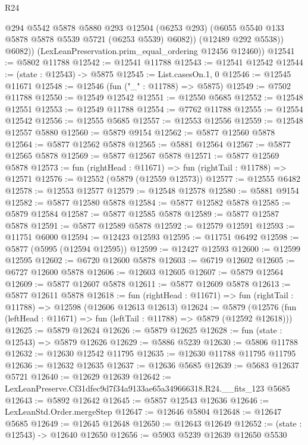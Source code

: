 \begin{lexlean}{R24}
\begin{coremodule}
              @294
              @5542
              @5878
              @5880
              @293
              @12504
              (@6253 @293)
              (@6055 @5540 @133 @5878 @5878 @5539 @5721 (@6253 @5539) @6082))
            (@12489 @292 @5538))
          @6082))
      (LexLeanPreservation.prim_equal_ordering @12456 @12460))
@12541 := @5802 @11788
@12542 := @12541 @11788
@12543 := @12541 @12542
@12544 := (state : @12543) -> @5875
@12545 := List.casesOn.{1, 0}
@12546 := @12545 @11671
@12548 := @12546 (fun ("_" : @11788) => @5875)
@12549 := @7502 @11788
@12550 := @12549 @12542
@12551 := @12550 @5685
@12552 := @12548 @12551
@12553 := @12549 @11788
@12554 := @7762 @11788
@12555 := @12554 @12542
@12556 := @12555 @5685
@12557 := @12553 @12556
@12559 := @12548 @12557 @5880
@12560 := @5879 @9154
@12562 := @5877 @12560 @5878
@12564 := @5877 @12562 @5878
@12565 := @5881 @12564
@12567 := @5877 @12565 @5878
@12569 := @5877 @12567 @5878
@12571 := @5877 @12569 @5878
@12573 := fun (rightHead : @11671) => fun (rightTail : @11788) => @12571
@12576 := @12552 (@5879 (@12559 @12573))
@12577 := @12555 @6482
@12578 := @12553 @12577
@12579 := @12548 @12578
@12580 := @5881 @9154
@12582 := @5877 @12580 @5878
@12584 := @5877 @12582 @5878
@12585 := @5879 @12584
@12587 := @5877 @12585 @5878
@12589 := @5877 @12587 @5878
@12591 := @5877 @12589 @5878
@12592 := @12579 @12591
@12593 := @11751 @6000
@12594 := @12423 @12593
@12595 := @11751 @6492
@12598 := @5877 (@5995 (@12594 @12595))
@12599 := @12427 @12593
@12600 := @12599 @12595
@12602 := @6720 @12600 @5878
@12603 := @6719 @12602
@12605 := @6727 @12600 @5878
@12606 := @12603 @12605
@12607 := @5879 @12564
@12609 := @5877 @12607 @5878
@12611 := @5877 @12609 @5878
@12613 := @5877 @12611 @5878
@12618 := fun (rightHead : @11671) => fun (rightTail : @11788) => @12598 (@12606 @12613 @12613)
@12624 := @5879
    (@12576 (fun (leftHead : @11671) => fun (leftTail : @11788) => @5879 (@12592 @12618)))
@12625 := @5879 @12624
@12626 := @5879 @12625
@12628 := fun (state : @12543) => @5879 @12626
@12629 := @5886 @5239
@12630 := @5806 @11788
@12632 := @12630 @12542 @11795
@12635 := @12630 @11788 @11795 @11795
@12636 := @12632 @12635
@12637 := @12636 @5685
@12639 := @5683 @12637 @5721
@12640 := @12629 @12639
@12642 := LexLeanPreserve.Cf31dfec9d7f34a9133ae65a349666318.R24.__fits_123 @5685
@12643 := @5892 @12642
@12645 := @5857 @12543 @12636
@12646 := LexLeanStd.Order.mergeStep
@12647 := @12646 @5804
@12648 := @12647 @5685
@12649 := @12645 @12648
@12650 := @12643 @12649
@12652 := (state : @12543) -> @12640 @12650
@12656 := @5903 @5239 @12639 @12650 @5530

\end{coremodule}
\end{lexlean}
